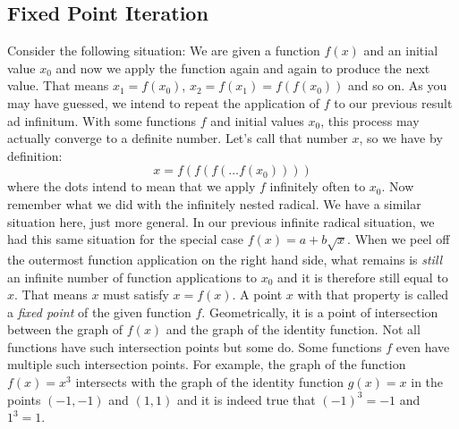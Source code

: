 \subsection{Fixed Point Iteration}
Consider the following situation: We are given a function $f(x)$ and an initial value $x_0$ and now we apply the function again and again to produce the next value. That means $x_1 = f(x_0)$, $x_2 = f(x_1) = f(f(x_0))$ and so on. As you may have guessed, we intend to repeat the application of $f$ to our previous result ad infinitum. With some functions $f$ and initial values $x_0$, this process may actually converge to a definite number. Let's call that number $x$, so we have by definition:
\begin{equation}
 x = f(f(f( \ldots f(x_0))))
\end{equation}
where the dots intend to mean that we apply $f$ infinitely often to $x_0$. Now remember what we did with the infinitely nested radical. We have a similar situation here, just more general. In our previous infinite radical situation, we had this same situation for the special case $f(x) = a + b \sqrt{x}$. When we peel off the outermost function application on the right hand side, what remains is \emph{still} an infinite number of function applications to $x_0$ and it is therefore still equal to $x$. That means $x$ must satisfy $x = f(x)$. A point $x$ with that property is called a \emph{fixed point} of the given function $f$. Geometrically, it is a point of intersection between the graph of $f(x)$ and the graph of the identity function. Not all functions have such intersection points but some do. Some functions $f$ even have multiple such intersection points. For example, the graph of the function $f(x) = x^3$ intersects with the graph of the identity function $g(x) = x$ in the points $(-1,-1)$ and $(1,1)$ and it is indeed true that $(-1)^3 = -1$ and $1^3 = 1$.

%
%
%
%




